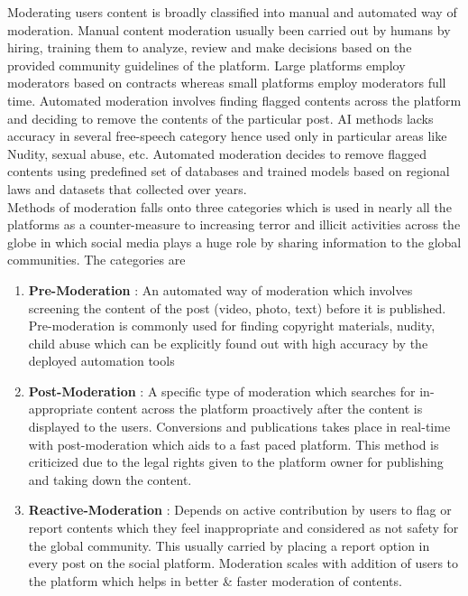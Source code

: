 \documentclass[10pt]{article}
\begin{document}
Moderating users content is broadly classified into manual and automated way of moderation. Manual content moderation usually been carried out by humans by hiring, training them to analyze, review and make decisions based on the provided community guidelines of the platform. Large platforms employ moderators based on contracts whereas small platforms employ moderators full time. Automated moderation involves finding flagged contents across the platform and deciding to remove the contents of the  particular post. AI methods lacks accuracy in several free-speech category hence used only in particular areas like Nudity, sexual abuse, etc. Automated moderation decides to remove flagged contents using predefined set of databases and trained models based on regional laws and datasets that collected over years.\\

Methods of moderation falls onto three categories which is used in nearly all the platforms as a counter-measure to increasing terror and illicit activities across the globe in which social media plays a huge role by sharing information to the global communities. The categories are
\begin{enumerate}[leftmargin=+0.2in]
\item \textbf{Pre-Moderation} : An automated way of moderation which involves screening the content of the post (video, photo, text) before it is published. Pre-moderation is commonly used for finding copyright materials, nudity, child abuse which can be explicitly found out with high accuracy by the deployed automation tools
\item \textbf{Post-Moderation} : A specific type of moderation which searches for in-appropriate content across the platform proactively after the content is displayed to the users. Conversions and publications takes place in real-time with post-moderation which aids to a fast paced platform. This method is criticized due to the legal rights given to the platform owner for publishing and taking down the content.
\item \textbf{Reactive-Moderation} : Depends on active contribution by users to flag or report contents which they feel inappropriate and considered as not safety for the global community. This usually carried by placing a report option in every post on the social platform. Moderation scales with addition of users to the platform which helps in better \& faster moderation of contents.
\end{enumerate}
\end{document}
